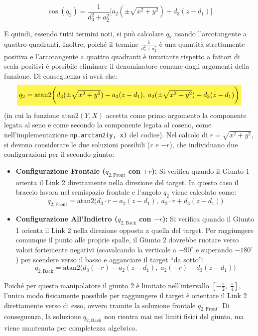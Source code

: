 ﻿\documentclass[11pt, a4paper]{article}
\begin{document}
\[
    \boxed{
        \cos(q_{2}) = \frac{1}{d_{3}^{2} + a_{2}^{2}} \biggl[a_{2} (\pm \sqrt{x^2+y^2}) + d_{3} (z - d_1)\biggr]
    }
\]

E quindi, essendo tutti termini noti, si può calcolare $q_{2}$ usando l'arcotangente a quattro quadranti. Inoltre, poiché il termine $\frac{1}{d_{3}^{2} + a_{2}^{2}}$ è una quantità strettamente positiva e l'arcotangente a quattro quadranti è invariante rispetto a fattori di scala positivi è possibile eliminare il denominatore comune dagli argomenti della funzione. Di conseguenza si avrà che:
\[
    \colorbox{customYellow}{$\displaystyle
        q_2 = \text{atan2}\biggl(d_{3} (\pm \sqrt{x^2+y^2}) - a_{2} (z - d_1), \; a_{2} (\pm \sqrt{x^2+y^2}) + d_{3} (z - d_1)\biggr)
    $}
\]
(in cui la funzione $\text{atan2}(Y, X)$ accetta come primo argomento la componente legata al seno e come secondo la componente legata al coseno, come nell'implementazione \texttt{np.arctan2(y, x)} del codice).
\newpage
Nel calcolo di $r = \sqrt{x^2 + y^2}$, si devono considerare le due soluzioni possibili ($r$ e $-r$), che individuano due configurazioni per il secondo giunto:
\begin{itemize}
    \item \textbf{Configurazione Frontale ($q_{2,\text{Front}}$ con $+r$):} Si verifica quando il Giunto 1 orienta il Link 2 direttamente nella direzione del target. In questo caso il braccio lavora nel semispazio frontale e l'angolo $q_2$ viene calcolato come:
    \[
        q_{2,\text{Front}} = \text{atan2}\biggl(d_{3} \cdot r - a_{2} (z - d_1), \; a_{2} \cdot r + d_{3} (z - d_1)\biggr)
    \]
    \item \textbf{Configurazione All'Indietro ($q_{2,\text{Back}}$ con $-r$):} Si verifica quando il Giunto 1 orienta il Link 2 nella direzione opposta a quella del target. Per raggiungere comunque il punto alle proprie spalle, il Giunto 2 dovrebbe ruotare verso valori fortemente negativi (scavalcando la verticale a $-90^\circ$ e superando $-180^\circ$) per scendere verso il basso e agganciare il target ``da sotto'':
    \[
        q_{2,\text{Back}} = \text{atan2}\biggl(d_{3} (-r) - a_{2} (z - d_1), \; a_{2} (-r) + d_{3} (z - d_1)\biggr)
    \]
\end{itemize}
Poiché per questo manipolatore il giunto 2 è limitato nell'intervallo $[-\frac{\pi}{2}, \; \frac{\pi}{4}]$, l'unico modo fisicamente possibile per raggiungere il target è orientare il Link 2 direttamente verso di esso, ovvero tramite la soluzione frontale $q_{2,\text{Front}}$. Di conseguenza, la soluzione $q_{2,\text{Back}}$ non rientra mai nei limiti fisici del giunto, ma viene mantenuta per completezza algebrica.
\end{document}
